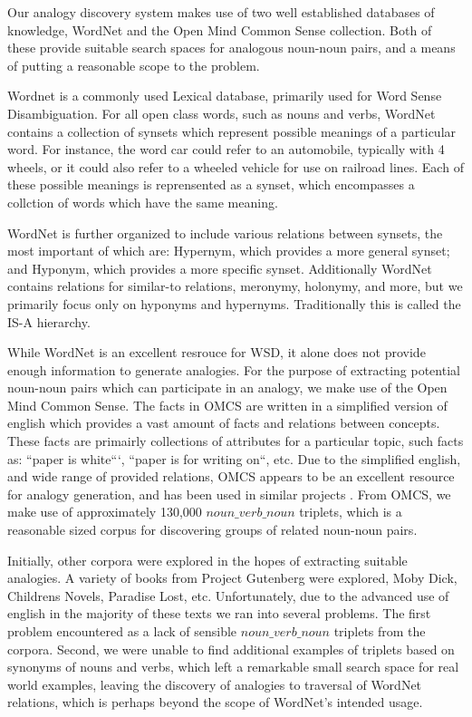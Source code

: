 \documentclass[11pt]{article}
\begin{document}
Our analogy discovery system makes use of two well established databases of
knowledge, WordNet \cite{fellbaum98wordnet} and the Open Mind Common Sense
\cite{havasi07conceptnet} collection.  Both of these provide suitable search
spaces for analogous noun-noun pairs, and a means of putting a reasonable scope
to the problem.

Wordnet \cite{fellbaum98wordnet} is a commonly used Lexical database, primarily used for Word Sense
Disambiguation.  For all open class words, such as nouns and verbs, WordNet
contains a collection of synsets which represent possible meanings of a
particular word.  For instance, the word car could refer to an automobile,
typically with 4 wheels, or it could also refer to a wheeled vehicle for use on
railroad lines.  Each of these possible meanings is reprensented as a synset,
which encompasses a collction of words which have the same meaning.

WordNet is further organized to include various relations between synsets, the
most important of which are: Hypernym, which provides a more general synset;
and Hyponym, which provides a more specific synset.  Additionally WordNet
contains relations for similar-to relations, meronymy, holonymy, and more, but
we primarily focus only on hyponyms and hypernyms.  Traditionally this is called
the IS-A hierarchy.

While WordNet is an excellent resrouce for WSD, it alone does not provide enough
information to generate analogies.  For the purpose of extracting potential
noun-noun pairs which can participate in an analogy, we make use of the Open
Mind Common Sense.  The facts in OMCS are written in a simplified version of
english which provides a vast amount of facts and relations between concepts.
These facts are primairly collections of attributes for a particular topic, such
facts as: ``paper is white```, ``paper is for writing on``, etc.  Due to the
simplified english, and wide range of provided relations, OMCS appears to be an
excellent resource for analogy generation, and has been used in similar projects
\cite{speer08analogyspace}.  From OMCS, we make use of approximately 130,000
$noun\_verb\_noun$ triplets, which is a reasonable sized corpus for discovering
groups of related noun-noun pairs.


Initially, other corpora were explored in the hopes of extracting suitable
analogies.  A variety of books from Project Gutenberg were explored, Moby Dick,
Childrens Novels, Paradise Lost, etc.  Unfortunately, due to the advanced use of
english in the majority of these texts we ran into several problems.  The first
problem encountered as a lack of sensible $noun\_verb\_noun$ triplets from the
corpora.  Second, we were unable to find additional examples of triplets based
on synonyms of nouns and verbs, which left a remarkable small search space for
real world examples, leaving the discovery of analogies to traversal of WordNet
relations, which is perhaps beyond the scope of WordNet's intended usage.
\end{document}
